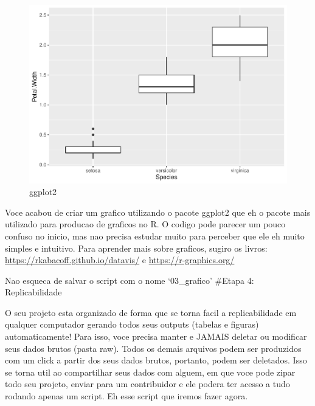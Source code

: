 \documentclass[
]{book}
\begin{document}
\begin{figure}
\centering
\includegraphics{_main_files/figure-latex/graph-1.pdf}
\caption{\label{fig:graph}ggplot2}
\end{figure}

Voce acabou de criar um grafico utilizando o pacote ggplot2 que eh o pacote mais utilizado para producao de graficos no R. O codigo pode parecer um pouco confuso no inicio, mas nao precisa estudar muito para perceber que ele eh muito simples e intuitivo. Para aprender mais sobre graficos, sugiro os livros: \url{https://rkabacoff.github.io/datavis/} e \url{https://r-graphics.org/}

Nao esqueca de salvar o script com o nome `03\_grafico'
\#Etapa 4: Replicabilidade

O seu projeto esta organizado de forma que se torna facil a replicabilidade em qualquer computador gerando todos seus outputs (tabelas e figuras) automaticamente! Para isso, voce precisa manter e JAMAIS deletar ou modificar seus dados brutos (pasta raw). Todos os demais arquivos podem ser produzidos com um click a partir dos seus dados brutos, portanto, podem ser deletados. Isso se torna util ao compartilhar seus dados com alguem, em que voce pode zipar todo seu projeto, enviar para um contribuidor e ele podera ter acesso a tudo rodando apenas um script. Eh esse script que iremos fazer agora.
\end{document}
